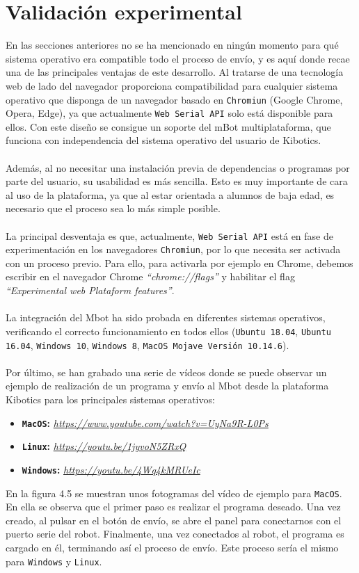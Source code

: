 \documentclass{report}
\begin{document}
\section{Validación experimental}

En las secciones anteriores no se ha mencionado en ningún momento para qué sistema operativo era compatible todo el proceso de envío, y es aquí donde recae una de las principales ventajas de este desarrollo. Al tratarse de una tecnología web de lado del navegador proporciona compatibilidad para cualquier sistema operativo que disponga de un navegador basado en \texttt{Chromiun} (Google Chrome, Opera, Edge), ya que actualmente \texttt{Web Serial API} solo está disponible para ellos. Con este diseño se consigue un soporte del mBot multiplataforma, que funciona con independencia del sistema operativo del usuario de Kibotics.
\\
\\
Además, al no necesitar una instalación previa de dependencias o programas por parte del usuario, su usabilidad es más sencilla. Esto es muy importante de cara al uso de la plataforma, ya que al estar orientada a alumnos de baja edad, es necesario que el proceso sea lo más simple posible.
\\
\\
La principal desventaja es que, actualmente, \texttt{Web Serial API}  está en fase de experimentación en los navegadores \texttt{Chromiun}, por lo que necesita ser activada con un proceso previo. Para ello, para activarla por ejemplo en Chrome, debemos escribir en el navegador Chrome \textit{“chrome://flags”} y habilitar el flag \textit{“Experimental web Plataform features”}.
\\ 
\\
La integración del Mbot ha sido probada en diferentes sistemas operativos, verificando el correcto funcionamiento en todos ellos (\texttt{Ubuntu 18.04}, \texttt{Ubuntu 16.04}, \texttt{Windows 10},  \texttt{Windows 8},  \texttt{MacOS Mojave Versión 10.14.6}).
\\
\\
Por último, se han grabado una serie de vídeos donde se puede observar un ejemplo de realización de un programa y envío al Mbot desde la plataforma Kibotics para los principales sistemas operativos:
\begin{itemize}
	\item \textbf {\texttt{MacOS}:} \textit{\url{https://www.youtube.com/watch?v=UyNa9R-L0Ps}}
	\item \textbf{\texttt{Linux}:} \textit{\url{https://youtu.be/1jyvoN5ZRxQ}}
	\item \textbf {\texttt{Windows}:} \textit{\url{https://youtu.be/4Wq4kMRUeIc}}
\end{itemize}
En la figura 4.5 se muestran unos fotogramas del vídeo de ejemplo para \texttt{MacOS}. En ella se observa que el primer paso es realizar el programa deseado. Una vez creado, al pulsar en el botón de envío, se abre el panel para conectarnos con el puerto serie del robot. Finalmente, una vez conectados al robot, el programa es cargado en él, terminando así el proceso de envío. Este proceso sería el mismo para \texttt{Windows} y \texttt{Linux}.
\end{document}
